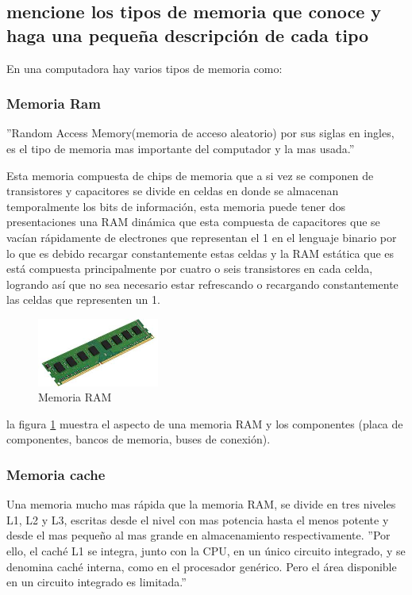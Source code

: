 \documentclass{article}
\begin{document}
    \subsection{mencione los tipos de memoria que conoce y haga una pequeña descripción de cada tipo}
    En una computadora hay varios tipos de memoria como: 
    
        \subsubsection{Memoria Ram}
        ''Random Access Memory(memoria de acceso aleatorio) por sus siglas en ingles, es el tipo de memoria mas importante del computador y la mas usada.'' \cite{arquitectura} \newline

        Esta memoria compuesta de chips de memoria que a si vez se componen de transistores y capacitores se divide en celdas en donde se almacenan temporalmente los bits de información, esta memoria puede tener dos presentaciones una RAM dinámica que esta compuesta de capacitores que se vacían rápidamente de electrones que representan el 1 en el lenguaje binario por lo que es debido recargar constantemente estas celdas y la RAM estática que es está compuesta principalmente por cuatro o seis transistores en cada celda, logrando así que no sea necesario estar refrescando o recargando constantemente las celdas que representen un 1.
        
        \begin{figure}[h]
        \includegraphics[width=4cm]{ram.jpg}
        \centering
        \caption{Memoria RAM}
        \label{fig:Memoria RAM}
        \end{figure}    
        
        la figura \ref{fig:Memoria RAM} muestra el aspecto de una memoria RAM y los componentes (placa de componentes, bancos de memoria, buses de conexión).
        
        \subsubsection{Memoria cache}
        Una memoria mucho mas rápida que la memoria RAM, se divide en tres niveles L1, L2 y L3, escritas desde el nivel con mas potencia hasta el menos potente y desde el mas pequeño al mas grande en almacenamiento respectivamente. ''Por ello, el caché L1 se integra, junto con la CPU, en un único circuito integrado, y se denomina caché interna, como en el procesador genérico. Pero el área  disponible en un circuito integrado es limitada.'' \cite{Mano}
        
\end{document}
